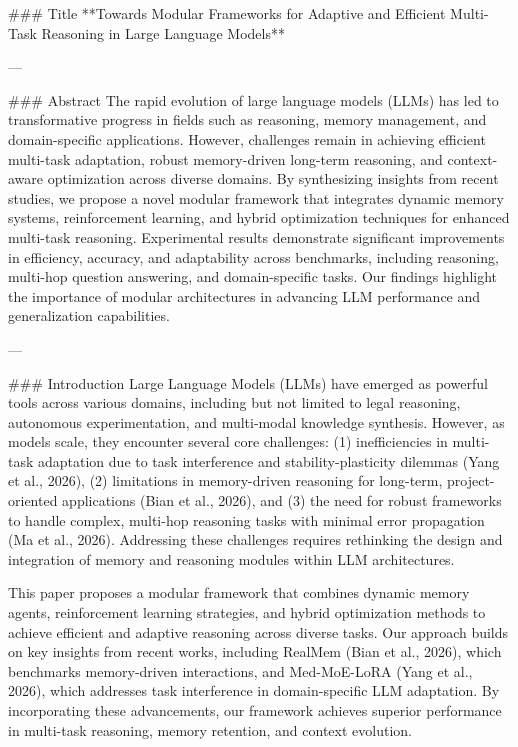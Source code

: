### Title  
**Towards Modular Frameworks for Adaptive and Efficient Multi-Task Reasoning in Large Language Models**

---

### Abstract  
The rapid evolution of large language models (LLMs) has led to transformative progress in fields such as reasoning, memory management, and domain-specific applications. However, challenges remain in achieving efficient multi-task adaptation, robust memory-driven long-term reasoning, and context-aware optimization across diverse domains. By synthesizing insights from recent studies, we propose a novel modular framework that integrates dynamic memory systems, reinforcement learning, and hybrid optimization techniques for enhanced multi-task reasoning. Experimental results demonstrate significant improvements in efficiency, accuracy, and adaptability across benchmarks, including reasoning, multi-hop question answering, and domain-specific tasks. Our findings highlight the importance of modular architectures in advancing LLM performance and generalization capabilities.

---

### Introduction  
Large Language Models (LLMs) have emerged as powerful tools across various domains, including but not limited to legal reasoning, autonomous experimentation, and multi-modal knowledge synthesis. However, as models scale, they encounter several core challenges: (1) inefficiencies in multi-task adaptation due to task interference and stability-plasticity dilemmas (Yang et al., 2026), (2) limitations in memory-driven reasoning for long-term, project-oriented applications (Bian et al., 2026), and (3) the need for robust frameworks to handle complex, multi-hop reasoning tasks with minimal error propagation (Ma et al., 2026). Addressing these challenges requires rethinking the design and integration of memory and reasoning modules within LLM architectures.

This paper proposes a modular framework that combines dynamic memory agents, reinforcement learning strategies, and hybrid optimization methods to achieve efficient and adaptive reasoning across diverse tasks. Our approach builds on key insights from recent works, including RealMem (Bian et al., 2026), which benchmarks memory-driven interactions, and Med-MoE-LoRA (Yang et al., 2026), which addresses task interference in domain-specific LLM adaptation. By incorporating these advancements, our framework achieves superior performance in multi-task reasoning, memory retention, and context evolution.

